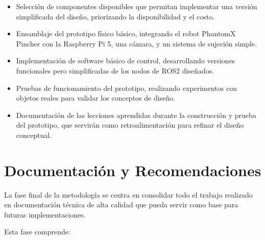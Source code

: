 \begin{itemize}
    \item Selección de componentes disponibles que permitan implementar una versión simplificada del diseño, priorizando la disponibilidad y el costo.
    
    \item Ensamblaje del prototipo físico básico, integrando el robot PhantomX Pincher con la Raspberry Pi 5, una cámara, y un sistema de sujeción simple.
    
    \item Implementación de software básico de control, desarrollando versiones funcionales pero simplificadas de los nodos de ROS2 diseñados.
    
    \item Pruebas de funcionamiento del prototipo, realizando experimentos con objetos reales para validar los conceptos de diseño.
    
    \item Documentación de las lecciones aprendidas durante la construcción y prueba del prototipo, que servirán como retroalimentación para refinar el diseño conceptual.
\end{itemize}

\section{Documentación y Recomendaciones}

La fase final de la metodología se centra en consolidar todo el trabajo realizado en documentación técnica de alta calidad que pueda servir como base para futuras implementaciones.

Esta fase comprende:

